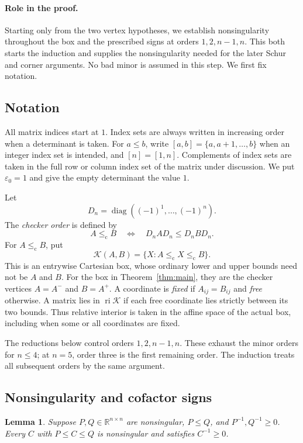 \documentclass[10pt,a4paper]{article}
\newtheorem{lemma}[theorem]{Lemma}
\theoremstyle{definition}
\theoremstyle{remark}
\numberwithin{equation}{section}
\newcommand{\R}{\mathbb R}
\newcommand{\eps}{\varepsilon}
\newcommand{\K}{\mathcal K}
\newcommand{\chle}{\leq_{\mathrm c}}
\DeclareMathOperator{\diag}{diag}
\DeclareMathOperator{\ri}{ri}
\begin{document}
\paragraph{Role in the proof.}
Starting only from the two vertex hypotheses, we establish nonsingularity
throughout the box and the prescribed signs at orders $1,2,n-1,n$. This
both starts the induction and supplies the nonsingularity needed for the
later Schur and corner arguments. No bad minor is assumed in this step.
We first fix notation.

\subsection{Notation}

All matrix indices start at $1$. Index sets are always written in
increasing order when a determinant is taken. For $a\leq b$, write
$[a,b]=\{a,a+1,\ldots,b\}$ when an integer index set is intended, and
$[n]=[1,n]$. Complements of index sets are taken in the full row or
column index set of the matrix under discussion. We put $\eps_0=1$
and give the empty determinant the value $1$.

Let
\[
 D_n=\diag((-1)^1,\ldots,(-1)^n).
\]
The \emph{checker order} is defined by
\[
 A\chle B\quad\Longleftrightarrow\quad D_nAD_n\leq D_nBD_n.
\]
For $A\chle B$, put
\[
 \K(A,B)=\{X:A\chle X\chle B\}.
\]
This is an entrywise Cartesian box, whose ordinary lower and upper
bounds need not be $A$ and $B$. For the box in
Theorem~\ref{thm:main}, they are the checker vertices $A=A^-$ and
$B=A^+$. A coordinate is \emph{fixed} if $A_{ij}=B_{ij}$ and
\emph{free} otherwise. A matrix lies in $\ri\K$ if each free
coordinate lies strictly between its two bounds. Thus relative interior
is taken in the affine space of the actual box, including when some or
all coordinates are fixed.


The reductions below control orders $1,2,n-1,n$. These exhaust the
minor orders for $n\leq4$; at $n=5$, order three is the first remaining
order. The induction treats all subsequent orders by the same argument.

\subsection{Nonsingularity and cofactor signs}

\begin{lemma}\label{lem:inverse}
Suppose $P,Q\in\R^{n\times n}$ are nonsingular, $P\leq Q$, and
$P^{-1},Q^{-1}\geq0$. Every $C$ with $P\leq C\leq Q$ is
nonsingular and satisfies $C^{-1}\geq0$.
\end{lemma}
\end{document}
